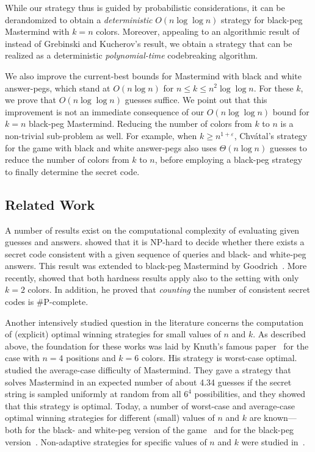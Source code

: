\documentclass[english,a4paper,11pt]{article}
\newcommand{\eps}{{\varepsilon}}
\newcommand{\ifLongCites}[2]{#1}
\newcommand{\ifLongCites}[2]{#2}
\begin{document}
{While our strategy thus is guided by probabilistic considerations, it can be derandomized to obtain a \emph{deterministic} $O(n\log\log n)$ strategy for black-peg Mastermind with $k=n$ colors. Moreover, appealing to an algorithmic result of \ifLongCites{\cite{Bshouty09}}{Bshouty~\cite{Bshouty09}} instead of Grebinski and Kucherov's result, we obtain a strategy that can be realized as a deterministic \emph{polynomial-time} codebreaking algorithm.

We also improve the current-best bounds for Mastermind with black and white answer-pegs, which stand at $O(n \log n)$ for $n\le k \le n^2 \log\log n$. For these $k$, we prove that $O(n \log\log n)$ guesses suffice. We point out that this improvement is not an immediate consequence of our $O(n \log\log n)$ bound for $k = n$ black-peg Mastermind. Reducing the number of colors from $k$ to $n$ is a non-trivial sub-problem as well. For example, when $k \ge n^{1 + \eps}$, Chv\'atal's strategy  for the game with black and white answer-pegs also uses $\Theta(n \log n)$ guesses to reduce the number of colors from $k$ to $n$, before employing a black-peg strategy to finally determine the secret code.



\subsection{Related Work}
\label{sec:review}

A number of results exist on the computational complexity of evaluating given guesses and answers. \ifLongCites{\cite{StuckmanZ06}}{Stuckman and Zhang~\cite{StuckmanZ06}} showed 
that it is NP-hard to decide whether there exists a secret code consistent with a given sequence of queries and black- and white-peg answers.
This result was extended to black-peg Mastermind by Goodrich~\cite{Goodrich09}.
%
More recently, \ifLongCites{\cite{Viglietta12}}{Viglietta~\cite{Viglietta12}} showed that both hardness results apply also to the setting with only $k=2$ colors. In addition, he proved that \emph{counting} the number of consistent secret codes is $\#$P-complete.

Another intensively studied question in the literature concerns the computation of (explicit) optimal winning strategies for small values of $n$ and $k$. 
As described above, the foundation for these works was laid by Knuth's famous paper~\cite{Knuth77} for the case with $n=4$ positions and $k=6$ colors. 
His strategy is worst-case optimal.
%
\ifLongCites{\cite{KoyamaL93}}{Koyama and Lai~\cite{KoyamaL93}} studied the average-case difficulty of Mastermind. They gave a strategy that solves Mastermind in an expected number of about 4.34 guesses if the secret string is sampled uniformly at random from all $6^4$ possibilities, and they showed that this strategy is optimal.
%
Today, a number of worst-case and average-case optimal winning strategies for different (small) values of $n$ and $k$ are known---both for the black- and white-peg version of the game~\cite{Goddard04,JaegerP09} and for the black-peg version~\cite{JaegerP11}. 
Non-adaptive strategies for specific values of $n$ and $k$ were studied in~\cite{Goddard03}.  

}
\end{document}
